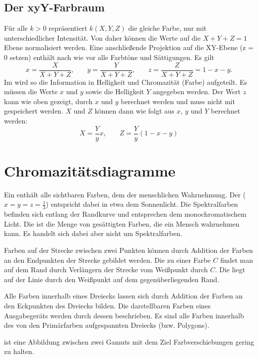\subsection{Der xyY-Farbraum}
Für alle $k > 0$ repräsentiert $k(X, Y, Z)$ die gleiche Farbe, nur mit unterschiedlicher Intensität.
Von daher können die Werte auf die $X + Y + Z = 1$ Ebene normalisiert werden.
Eine anschließende Projektion auf die XY-Ebene (z = 0 setzen) enthält nach wie vor alle Farbtöne und Sättigungen.
Es gilt
\[
	x = \frac{X}{X + Y + Z} \text{,} \qquad
	y = \frac{Y}{X + Y + Z} \text{,} \qquad
	z = \frac{Z}{X + Y + Z} = 1 - x - y \text{.}
\]
Im  wird so die Information in Helligkeit und Chromazität (Farbe) aufgeteilt.
Es müssen die Werte $x$ und $y$ sowie die Helligkeit $Y$ angegeben werden.
Der Wert $z$ kann wie oben gezeigt, durch $x$ und $y$ berechnet werden und muss nicht mit gespeichert werden.
$X$ und $Z$ können dann wie folgt aus $x$, $y$ und $Y$ berechnet werden:
\[
	X = \frac{Y}{y}x \text{,} \qquad
	Z = \frac{Y}{y}(1 - x - y)
\]

\section{Chromazitätsdiagramme}
Ein  enthält alle sichtbaren Farben, dem  der menschlichen Wahrnehmung.
Der  ($x = y = z = \frac{1}{3}$) entspricht dabei in etwa dem Sonnenlicht.
Die Spektralfarben befinden sich entlang der Randkurve und entsprechen dem monochromatischem Licht.
Die  ist die Menge von gesättigten Farben, die ein Mensch wahrnehmen kann.
Es handelt sich dabei aber nicht um Spektralfarben.

Farben auf der Strecke zwischen zwei Punkten können durch Addition der Farben an den Endpunkten der Strecke gebildet werden.
Die  zu einer Farbe $C$ findet man auf dem Rand durch Verlängern der Strecke vom Weißpunkt durch $C$.
Die  liegt auf der Linie durch den Weißpunkt auf dem gegenüberliegenden Rand.

Alle Farben innerhalb eines Dreiecks lassen sich durch Addition der Farben an den Eckpunkten des Dreiecks bilden.
Die darstellbaren Farben eines Ausgabegeräts werden durch dessen  beschrieben.
Es sind alle Farben innerhalb des von den Primärfarben aufgespannten Dreiecks (bzw. Polygons).

 ist eine Abbildung zwischen zwei Gamuts mit dem Ziel Farbverschiebungen gering zu halten.
